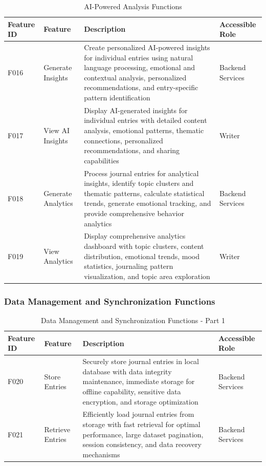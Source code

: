 \begin{table}[H]
\centering
\caption{AI-Powered Analysis Functions}
\label{tab:ai-analysis-functions}
\begin{tabular}{|p{0.8cm}|p{2.2cm}|p{9.5cm}|p{1.5cm}|}
\hline
\textbf{Feature ID} & \textbf{Feature} & \textbf{Description} & \textbf{Accessible Role} \\
\hline
F016 & Generate Insights & Create personalized AI-powered insights for individual entries using natural language processing, emotional and contextual analysis, personalized recommendations, and entry-specific pattern identification & Backend Services \\
\hline
F017 & View AI Insights & Display AI-generated insights for individual entries with detailed content analysis, emotional patterns, thematic connections, personalized recommendations, and sharing capabilities & Writer \\
\hline
F018 & Generate Analytics & Process journal entries for analytical insights, identify topic clusters and thematic patterns, calculate statistical trends, generate emotional tracking, and provide comprehensive behavior analytics & Backend Services \\
\hline
F019 & View Analytics & Display comprehensive analytics dashboard with topic clusters, content distribution, emotional trends, mood statistics, journaling pattern visualization, and topic area exploration & Writer \\
\hline
\end{tabular}
\end{table}

\subsubsection{Data Management and Synchronization Functions}

\begin{table}[H]
\centering
\caption{Data Management and Synchronization Functions - Part 1}
\label{tab:data-management-functions-1}
\begin{tabular}{|p{0.8cm}|p{2.2cm}|p{9.5cm}|p{1.5cm}|}
\hline
\textbf{Feature ID} & \textbf{Feature} & \textbf{Description} & \textbf{Accessible Role} \\
\hline
F020 & Store Entries & Securely store journal entries in local database with data integrity maintenance, immediate storage for offline capability, sensitive data encryption, and storage optimization & Backend Services \\
\hline
F021 & Retrieve Entries & Efficiently load journal entries from storage with fast retrieval for optimal performance, large dataset pagination, session consistency, and data recovery mechanisms & Backend Services \\
\hline
\end{tabular}
\end{table}

